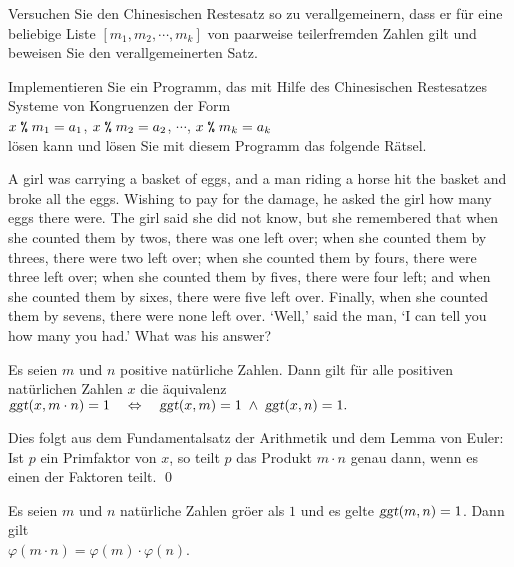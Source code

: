 \exercise
Versuchen Sie den Chinesischen Restesatz so zu verallgemeinern, dass er f\"{u}r eine beliebige
Liste $[m_1, m_2, \cdots, m_k]$ von paarweise teilerfremden Zahlen gilt und beweisen
Sie den verallgemeinerten Satz.

\exercise
Implementieren Sie ein Programm, das mit Hilfe des Chinesischen Restesatzes Systeme von
Kongruenzen der Form
\\[0.2cm]
\hspace*{1.3cm}
$x \;\texttt{\%}\; m_1 = a_1$, 
$x \;\texttt{\%}\; m_2 = a_2$, $\cdots$,
$x \;\texttt{\%}\; m_k = a_k$
\\[0.2cm]
l\"{o}sen kann und l\"{o}sen Sie mit diesem Programm das folgende R\"{a}tsel.
\vspace*{0.2cm}

\begin{minipage}[t]{0.9\linewidth}
  A girl was carrying a basket of eggs, and a man riding a horse hit
  the basket and broke all the eggs. Wishing to pay for the damage, he
  asked the girl how many eggs there were. The girl said she did not
  know, but she remembered that when she counted them by twos, there
  was one left over; when she counted them by threes, there were two
  left over; when she counted them by fours, there were three left
  over; when she counted them by fives, there were four left; and when
  she counted them by sixes, there were five left over. Finally, when
  she counted them by sevens, there were none left over. `Well,' said
  the man, `I can tell you how many you had.' What was his answer?
\end{minipage}

\begin{Satz} \label{satz:china3}
  Es seien $m$ und $n$ positive nat\"{u}rliche Zahlen.
  Dann gilt f\"{u}r alle positiven nat\"{u}rlichen Zahlen $x$ die \"{a}quivalenz
  \\[0.2cm]
  \hspace*{1.3cm}
  $\textsl{ggt}(x, m \cdot n) = 1 \quad \Leftrightarrow \quad
   \textsl{ggt}(x, m) = 1 \;\wedge\; \textsl{ggt}(x, n) = 1.
  $
\end{Satz}

\proof
Dies folgt aus dem Fundamentalsatz der Arithmetik und dem Lemma von Euler: Ist $p$ ein
Primfaktor von $x$, so teilt $p$ das Produkt $m \cdot n$ genau dann, wenn es einen der
Faktoren teilt. \qed



\begin{Satz} \lb
  Es seien $m$ und $n$ nat\"{u}rliche Zahlen gr\"{o}\3er als $1$ und es gelte $\textsl{ggt}(m,n) = 1$.
  Dann gilt
  \\[0.2cm]
  \hspace*{1.3cm}
  $\varphi(m \cdot n) = \varphi(m) \cdot \varphi(n)$.
\end{Satz}

